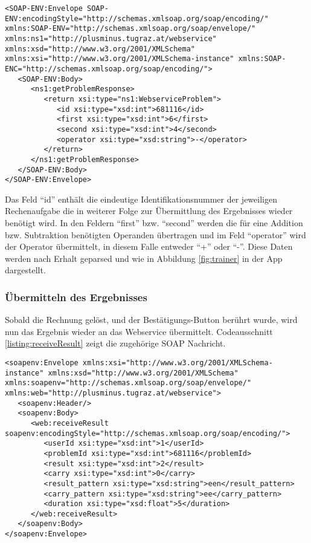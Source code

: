 \begin{lstlisting}[caption=Erhalten einer Rechenaufgabe, label=listing:getProblemAnswer]
<SOAP-ENV:Envelope SOAP-ENV:encodingStyle="http://schemas.xmlsoap.org/soap/encoding/" xmlns:SOAP-ENV="http://schemas.xmlsoap.org/soap/envelope/" xmlns:ns1="http://plusminus.tugraz.at/webservice" xmlns:xsd="http://www.w3.org/2001/XMLSchema" xmlns:xsi="http://www.w3.org/2001/XMLSchema-instance" xmlns:SOAP-ENC="http://schemas.xmlsoap.org/soap/encoding/">
   <SOAP-ENV:Body>
      <ns1:getProblemResponse>
         <return xsi:type="ns1:WebserviceProblem">
            <id xsi:type="xsd:int">681116</id>
            <first xsi:type="xsd:int">6</first>
            <second xsi:type="xsd:int">4</second>
            <operator xsi:type="xsd:string">-</operator>
         </return>
      </ns1:getProblemResponse>
   </SOAP-ENV:Body>
</SOAP-ENV:Envelope>
\end{lstlisting}

Das Feld \enquote{id} enthält die eindeutige Identifikationsnummer der jeweiligen Rechenaufgabe die 
in weiterer Folge zur Übermittlung des Ergebnisses wieder benötigt wird. In den 
Feldern \enquote{first} bzw. \enquote{second} werden die für eine Addition bzw. Subtraktion benötigten 
Operanden übertragen und im Feld \enquote{operator} wird der Operator übermittelt, in diesem Falle entweder
\enquote{+} oder \enquote{-}. Diese Daten werden nach Erhalt geparsed und wie in Abbildung \ref{fig:trainer} in der App dargestellt.

\subsubsection{Übermitteln des Ergebnisses}
Sobald die Rechnung gelöst, und der Bestätigungs-Button berührt wurde, wird nun das Ergebnis wieder an das 
Webservice übermittelt. Codeausschnitt \ref{listing:receiveResult} zeigt die zugehörige SOAP Nachricht.
\begin{lstlisting}[caption=Übermitteln des Resultats, label=listing:receiveResult]
<soapenv:Envelope xmlns:xsi="http://www.w3.org/2001/XMLSchema-instance" xmlns:xsd="http://www.w3.org/2001/XMLSchema" xmlns:soapenv="http://schemas.xmlsoap.org/soap/envelope/" xmlns:web="http://plusminus.tugraz.at/webservice">
   <soapenv:Header/>
   <soapenv:Body>
      <web:receiveResult soapenv:encodingStyle="http://schemas.xmlsoap.org/soap/encoding/">
         <userId xsi:type="xsd:int">1</userId>
         <problemId xsi:type="xsd:int">681116</problemId>
         <result xsi:type="xsd:int">2</result>
         <carry xsi:type="xsd:int">0</carry>
         <result_pattern xsi:type="xsd:string">een</result_pattern>
         <carry_pattern xsi:type="xsd:string">ee</carry_pattern>
         <duration xsi:type="xsd:float">5</duration>
      </web:receiveResult>
   </soapenv:Body>
</soapenv:Envelope>
\end{lstlisting}

